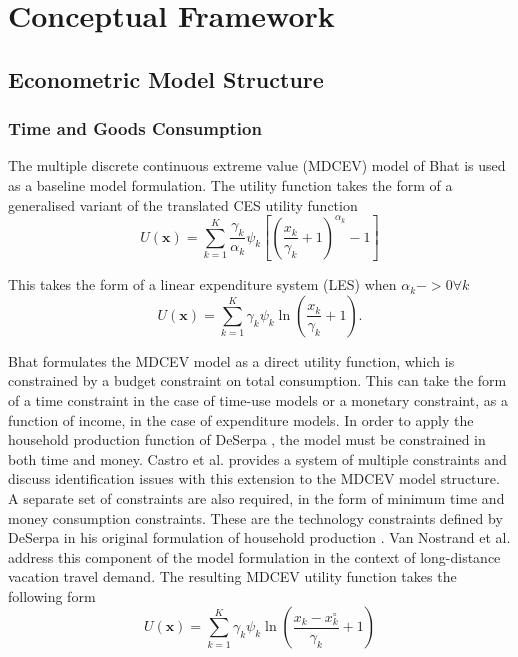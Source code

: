 \chapter{Conceptual Framework}
\section{Econometric Model Structure}
\subsection{Time and Goods Consumption}
The multiple discrete continuous extreme value (MDCEV) model of Bhat \cite{Bhat2005, Bhat2008TheExtensions} is used as a baseline model formulation. The utility function takes the form of a generalised variant of the translated CES utility function
\begin{equation}
    U(\textbf{x}) = \sum_{k=1}^K \frac{\gamma_k}{\alpha_k}\psi_k \left[\left(\frac{x_k}{\gamma_k}+1\right)^{\alpha_k} - 1\right]
\end{equation}

This takes the form of a linear expenditure system (LES) when $\alpha_k -> 0 \forall k$
\begin{equation}
    U(\textbf{x}) = \sum_{k=1}^K \gamma_k \psi_k \ln \left(\frac{x_k}{\gamma_k}+1\right) .
\end{equation}

Bhat formulates the MDCEV model as a direct utility function, which is constrained by a budget constraint on total consumption. This can take the form of a time constraint in the case of time-use models or a monetary constraint, as a function of income, in the case of expenditure models. In order to apply the household production function of DeSerpa \cite{DeSerpa1971}, the model must be constrained in both time and money. Castro et al. \cite{Castro2012AccommodatingModel} provides a system of multiple constraints and discuss identification issues with this extension to the MDCEV model structure. A separate set of constraints are also required, in the form of minimum time and money consumption constraints. These are the technology constraints defined by DeSerpa in his original formulation of household production \cite{DeSerpa1971}. Van Nostrand et al. \cite{VanNostrand2013AnalysisFramework} address this component of the model formulation in the context of long-distance vacation travel demand. The resulting MDCEV utility function takes the following form
\begin{equation}
    U(\textbf{x}) = \sum_{k=1}^K \gamma_k \psi_k \ln \left(\frac{x_k - x_k^\circ}{\gamma_k}+1\right)
\end{equation}

